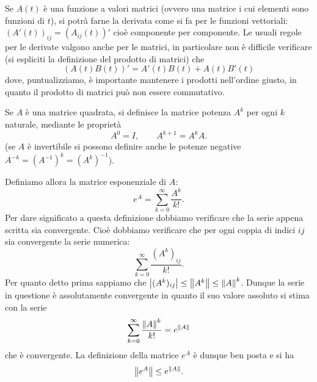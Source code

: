 Se $A(t)$ è una funzione a valori matrici (ovvero una matrice i cui
elementi sono funzioni di $t$), si potrà farne la derivata
come si fa per le funzioni vettoriali: $(A'(t))_{ij} = (A_{ij}(t))'$
cioè componente per componente. Le usuali regole per le derivate
valgono anche per le matrici, in particolare non è difficile
verificare (si espliciti la definizione del prodotto di matrici) che
\[
 (A(t)B(t))' = A'(t) B(t) + A(t) B'(t)
\]
dove, puntualizziamo, è importante mantenere i prodotti nell'ordine
giusto, in quanto il prodotto di matrici può non essere commutativo.

Se $A$ è una matrice quadrata, si definisce la matrice potenza $A^k$
per ogni $k$ naturale, mediante le proprietà
\[
  A^0 = I, \qquad A^{k+1} = A^kA.
\]
(se $A$ è invertibile si possono definire anche le potenze negative
$A^{-k}=(A^{-1})^k = (A^k)^{-1}$).

Definiamo allora la matrice esponenziale di $A$:
\[
  e^A = \sum_{k=0}^\infty \frac{A^k}{k!}.
\]
Per dare significato a questa definizione dobbiamo verificare che la
serie appena scritta sia convergente. Cioè dobbiamo verificare che per
ogni coppia di indici $ij$ sia convergente la serie numerica:
\[
 \sum_{k=0}^\infty \frac{(A^k)_{ij}}{k!}.
\]
Per quanto detto prima sappiamo che
${\left|(A^k)_{ij}\right|} \le {\left\Vert A^k\right\Vert} \le {\left\Vert A\right\Vert}^k$.
Dunque la serie in questione è
assolutamente convergente in quanto il suo valore assoluto si stima
con la serie
\[
 \sum_{k=0}^\infty \frac{{\left\Vert  A\right\Vert}^k}{k!} = e^{{\left\Vert  A\right\Vert}}
\]
che è convergente. La definizione della matrice $e^A$ è dunque
ben posta e si ha
\[
 {\left\Vert  e^A\right\Vert} \le e^{{\left\Vert  A \right\Vert}}.
\]

